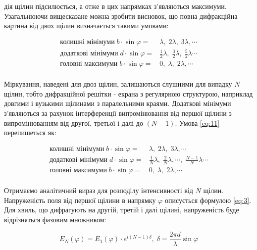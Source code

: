дія щілин підсилюється, а отже в цих напрямках з'являються
максимуми. Узагальнюючи вищесказане можна зробити висновок,
що повна дифракційна картина від двох щілин визначається такими
умовами:

\begin{equation} \label{eq:11}
    \begin{aligned}
        \text{колишні мінімуми} \; b \cdot \sin{\varphi} =& \lambda, \; 2 \lambda, \; 3 \lambda, \cdots \\
        \text{додаткові мінімуми} \; d \cdot \sin{\varphi} =& \frac{1}{2} \lambda, \; \frac{3}{2} \lambda, \; \frac{5}{2} \lambda \cdots \\
        \text{головні максимуми} \; b \cdot \sin{\varphi} =& 0, \; \lambda, \; 2 \lambda, \cdots \\
    \end{aligned}
\end{equation}

Міркування, наведені для двоз щілин, залишаються слушними для
випадку $N$ щілин, тобто дифракційної решітки - екрана з
регулярною структурою, наприклад довгими і вузькими щілинами
з паралельними краями. Додаткові мінімуми з'являються за рахунок
інтерференції випромінювання від першої щілини з випромінюванням
від другої, третьої і далі до $(N-1)$. Умова \ref{eq:11} перепишеться як:

\begin{equation} \label{eq:12}
    \begin{aligned}
        \text{колишні мінімуми} \; b \cdot \sin{\varphi} =& \lambda, \; 2 \lambda, \; 3 \lambda, \cdots \\
        \text{додаткові мінімуми} \; d \cdot \sin{\varphi} =& \frac{1}{N} \lambda, \; \frac{2}{N} \lambda ,\cdots, \; \frac{N-1}{N} \lambda \cdots \\
        \text{головні максимуми} \; b \cdot \sin{\varphi} =& 0, \; \lambda, \; 2 \lambda, \cdots \\
    \end{aligned}
\end{equation}


Отримаємо аналітичний вираз для розподілу інтенсивності від $N$ щілин.
Напруженість поля від першої щілини в напрямку $\varphi$ 
описується формулою \ref{eq:3}. Для хвиль, що дифрагують 
на другій, третій і далі щілині, напруженість буде відрізняться
фазовим множником:

\begin{equation} \label{eq:13}
    E_N(\varphi) = E_1(\varphi) \cdot e^{i(N-1)\delta}, \;
    \delta = \frac{2 \pi d}{\lambda} \sin{\varphi}
\end{equation}

